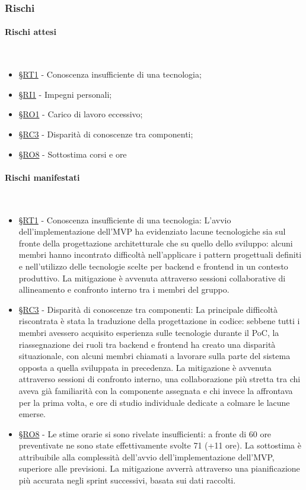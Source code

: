 \documentclass[10pt, letterpaper]{article}
\newcommand{\trisubsection}[1]{\paragraph{#1}\mbox{}\\}
\newcommand{\rif}[1]{\hyperref[#1]{§#1}}
\begin{document}
    \subsubsection{Rischi}
    \trisubsection{Rischi attesi}
    \begin{itemize}
    \item \rif{RT1} - Conoscenza insufficiente di una tecnologia;
    \item \rif{RI1} - Impegni personali;
    \item \rif{RO1} - Carico di lavoro eccessivo;
    \item \rif{RC3} - Disparità di conoscenze tra componenti;
    \item \rif{RO8} - Sottostima corsi e ore 
    \end{itemize}
    \trisubsection{Rischi manifestati}
    \begin{itemize}
        \item \rif{RT1} - Conoscenza insufficiente di una tecnologia: L'avvio dell'implementazione dell'MVP ha evidenziato lacune tecnologiche sia sul fronte della progettazione architetturale che su quello dello sviluppo: alcuni membri hanno incontrato difficoltà nell'applicare i pattern progettuali definiti e nell'utilizzo delle tecnologie scelte per backend e frontend in un contesto produttivo. La mitigazione è avvenuta attraverso sessioni collaborative di allineamento e confronto interno tra i membri del gruppo.
        \item \rif{RC3} - Disparità di conoscenze tra componenti: La principale difficoltà riscontrata è stata la traduzione della progettazione in codice: sebbene tutti i membri avessero acquisito esperienza sulle tecnologie durante il PoC, la riassegnazione dei ruoli tra backend e frontend ha creato una disparità situazionale, con alcuni membri chiamati a lavorare sulla parte del sistema opposta a quella sviluppata in precedenza. La mitigazione è avvenuta attraverso sessioni di confronto interno, una collaborazione più stretta tra chi aveva già familiarità con la componente assegnata e chi invece la affrontava per la prima volta, e ore di studio individuale dedicate a colmare le lacune emerse.
        \item \rif{RO8} - Le stime orarie si sono rivelate insufficienti: a fronte di 60 ore preventivate ne sono state effettivamente svolte 71 (+11 ore). La sottostima è attribuibile alla complessità dell'avvio dell'implementazione dell'MVP, superiore alle previsioni. La mitigazione avverrà attraverso una pianificazione più accurata negli sprint successivi, basata sui dati raccolti.
    \end{itemize}
\end{document}
